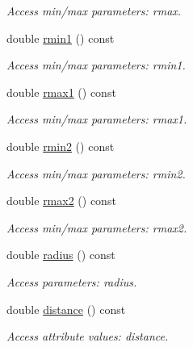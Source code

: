 \begin{DoxyCompactItemize}
\begin{DoxyCompactList}\small\item\em Access min/max parameters: rmax. \item\end{DoxyCompactList}\item 
double \hyperlink{struct_d_d4hep_1_1_x_m_l_1_1_child_value_ac3e6908c526cb563ed89264319f5ec07}{rmin1} () const 
\begin{DoxyCompactList}\small\item\em Access min/max parameters: rmin1. \item\end{DoxyCompactList}\item 
double \hyperlink{struct_d_d4hep_1_1_x_m_l_1_1_child_value_a69bfb0ab03a3dfc239d35d19e43bb073}{rmax1} () const 
\begin{DoxyCompactList}\small\item\em Access min/max parameters: rmax1. \item\end{DoxyCompactList}\item 
double \hyperlink{struct_d_d4hep_1_1_x_m_l_1_1_child_value_a20c8bfd0bea4a2d3a84556cb75289f72}{rmin2} () const 
\begin{DoxyCompactList}\small\item\em Access min/max parameters: rmin2. \item\end{DoxyCompactList}\item 
double \hyperlink{struct_d_d4hep_1_1_x_m_l_1_1_child_value_a26352df69d8839203a6343f567e3f16a}{rmax2} () const 
\begin{DoxyCompactList}\small\item\em Access min/max parameters: rmax2. \item\end{DoxyCompactList}\item 
double \hyperlink{struct_d_d4hep_1_1_x_m_l_1_1_child_value_a9deeef965fae4b2e98936dc0693405d6}{radius} () const 
\begin{DoxyCompactList}\small\item\em Access parameters: radius. \item\end{DoxyCompactList}\item 
double \hyperlink{struct_d_d4hep_1_1_x_m_l_1_1_child_value_a525e776ba0eb83d7e6c6d340b2e86d11}{distance} () const 
\begin{DoxyCompactList}\small\item\em Access attribute values: distance. \item\end{DoxyCompactList}\item 

\end{DoxyCompactItemize}
